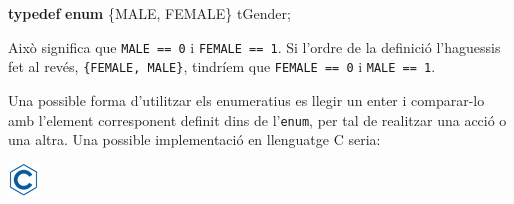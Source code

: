 \documentclass[]{book}
\newenvironment{Shaded}{\begin{snugshade}}{\end{snugshade}}
\newcommand{\KeywordTok}[1]{\textcolor[rgb]{0.13,0.29,0.53}{\textbf{#1}}}
\newcommand{\DataTypeTok}[1]{\textcolor[rgb]{0.13,0.29,0.53}{#1}}
\newcommand{\DecValTok}[1]{\textcolor[rgb]{0.00,0.00,0.81}{#1}}
\newcommand{\SpecialCharTok}[1]{\textcolor[rgb]{0.00,0.00,0.00}{#1}}
\newcommand{\StringTok}[1]{\textcolor[rgb]{0.31,0.60,0.02}{#1}}
\newcommand{\ImportTok}[1]{#1}
\newcommand{\ControlFlowTok}[1]{\textcolor[rgb]{0.13,0.29,0.53}{\textbf{#1}}}
\newcommand{\PreprocessorTok}[1]{\textcolor[rgb]{0.56,0.35,0.01}{\textit{#1}}}
\newcommand{\NormalTok}[1]{#1}
\begin{document}
\begin{Shaded}
\begin{Highlighting}[]
\KeywordTok{typedef} \KeywordTok{enum}\NormalTok{ \{MALE, FEMALE\} tGender;}
\end{Highlighting}
\end{Shaded}

Això significa que \texttt{MALE\ ==\ 0} i \texttt{FEMALE\ ==\ 1}. Si
l'ordre de la definició l'haguessis fet al revés,
\texttt{\{FEMALE,\ MALE\}}, tindríem que \texttt{FEMALE\ ==\ 0} i
\texttt{MALE\ ==\ 1}.

Una possible forma d'utilitzar els enumeratius es llegir un enter i
comparar-lo amb l'element corresponent definit dins de l'\texttt{enum},
per tal de realitzar una acció o una altra. Una possible implementació
en llenguatge C seria:

\includegraphics{./img/c.png}

\begin{Shaded}
\end{Shaded}
\end{document}

